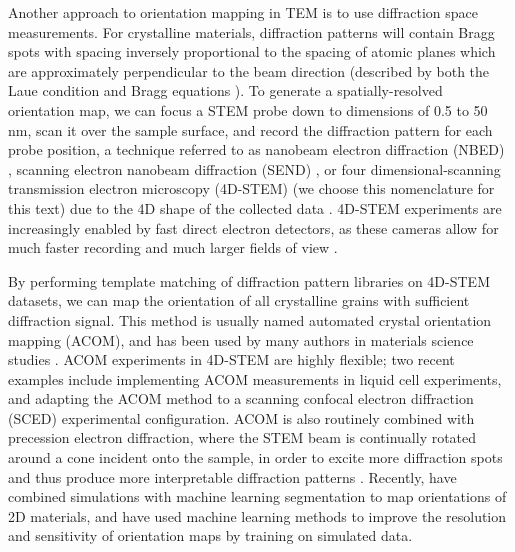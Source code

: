 \documentclass[%
 superscriptaddress,
 aip,
 amsmath,amssymb,
reprint,%
 author-year,%
longbibliography
]{revtex4-2}
\begin{document}
Another approach to orientation mapping in TEM is to use diffraction space measurements. For crystalline materials, diffraction patterns will contain Bragg spots with spacing inversely proportional to the spacing of atomic planes which are approximately perpendicular to the beam direction (described by both the Laue condition and Bragg equations \citep{fultz2012transmission}). To generate a spatially-resolved orientation map, we can focus a STEM probe down to dimensions of 0.5 to 50 nm, scan it over the sample surface, and record the diffraction pattern for each probe position, a technique referred to as nanobeam electron diffraction (NBED) \citep{ozdol2015strain}, scanning electron nanobeam diffraction (SEND) \citep{tao2009direct}, or four dimensional-scanning transmission electron microscopy (4D-STEM) (we choose this nomenclature for this text)  due to the 4D shape of the collected data \citep{bustillo20214d}. 4D-STEM experiments are increasingly enabled by fast direct electron detectors, as these cameras allow for much faster recording and much larger fields of view \citep{ophus2019four, nord2020fast, paterson2020fast}. 

By performing template matching of diffraction pattern libraries on 4D-STEM datasets, we can map the orientation of all crystalline grains with sufficient diffraction signal. This method is usually named automated crystal orientation mapping (ACOM), and has been used by many authors in materials science studies \citep{zaefferer1994line, rauch2005rapid, kobler2013combination, maclaren2020comparison, londono20201d, jeong2021automated, zuo2021strategies}. ACOM experiments in 4D-STEM are highly flexible; two recent examples include \cite{lang2021automated} implementing ACOM measurements in liquid cell experiments, and  \cite{wu2021seeing} adapting the ACOM method to a scanning confocal electron diffraction (SCED) experimental configuration. ACOM is also routinely combined with precession electron diffraction, where the STEM beam is continually rotated around a cone incident onto the sample, in order to excite more diffraction spots and thus produce more interpretable diffraction patterns \citep{brunetti2011confirmation, moeck2011high, eggeman2015scanning}. Recently, \cite{mehta2020unravelling} have combined simulations with machine learning segmentation to map orientations of 2D materials, and \cite{yuan2021training} have used machine learning methods to improve the resolution and sensitivity of orientation maps by training on simulated data.
\end{document}
